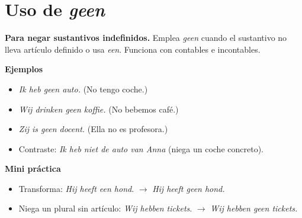 \section{Uso de \textit{geen}}
\textbf{Para negar sustantivos indefinidos.} Emplea \textit{geen} cuando el sustantivo no lleva artículo definido o usa \textit{een}. Funciona con contables e incontables.

\textbf{Ejemplos}
\begin{itemize}[leftmargin=*]
  \item \textit{Ik heb geen auto.} (No tengo coche.)
  \item \textit{Wij drinken geen koffie.} (No bebemos café.)
  \item \textit{Zij is geen docent.} (Ella no es profesora.)
  \item Contraste: \textit{Ik heb niet de auto van Anna} (niega un coche concreto).
\end{itemize}

\textbf{Mini práctica}
\begin{itemize}[leftmargin=*]
  \item Transforma: \textit{Hij heeft een hond}. $\rightarrow$ \textit{Hij heeft geen hond.}
  \item Niega un plural sin artículo: \textit{Wij hebben tickets}. $\rightarrow$ \textit{Wij hebben geen tickets.}
\end{itemize}
